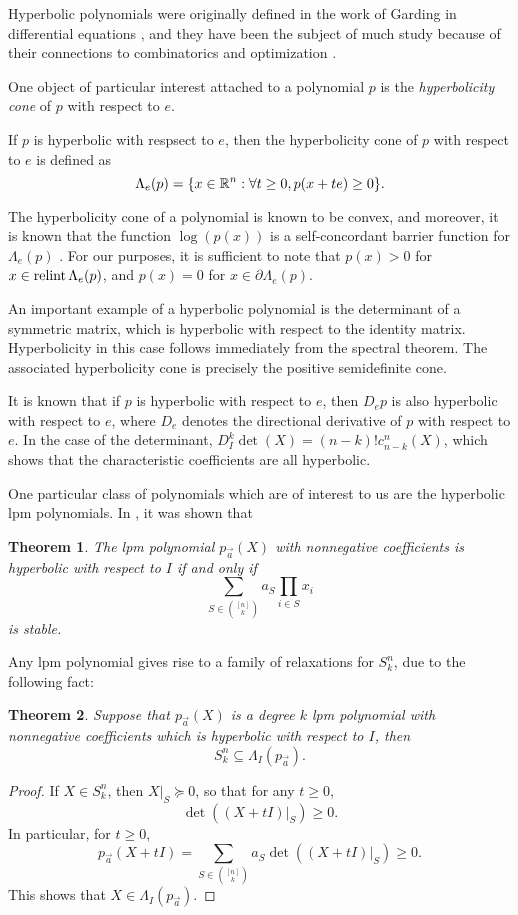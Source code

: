 \documentclass{amsart}
\newtheorem{theorem}{Theorem}[section]
\theoremstyle{definition}
\numberwithin{equation}{section}
\begin{document}
Hyperbolic polynomials were originally defined in the work of Garding in differential equations \cite{gaarding1951linear}, and they have been the subject of much study because of their connections to combinatorics and optimization \cite{wagner2011multivariate}.

One object of particular interest attached to a polynomial $p$ is the \emph{hyperbolicity cone} of $p$ with respect to $e$.

If $p$ is hyperbolic with respsect to $e$, then the hyperbolicity cone of $p$ with respect to $e$ is defined as
\[
    \Lambda_e(p) = \{x \in \mathbb{R}^n : \forall t \ge 0, p(x+te) \ge 0\}.
\]

The hyperbolicity cone of a polynomial is known to be convex, and moreover, it is known that the function $\log(p(x))$ is a self-concordant barrier function for $\Lambda_e(p)$ \cite{guler1997hyperbolic}. 
For our purposes, it is sufficient to note that $p(x) > 0$ for $x \in \operatorname*{relint}\Lambda_e(p)$, and $p(x) = 0$ for $x \in \partial \Lambda_e(p)$.

An important example of a hyperbolic polynomial is the determinant of a symmetric matrix, which is hyperbolic with respect to the identity matrix. Hyperbolicity in this case follows immediately from the spectral theorem. The associated hyperbolicity cone is precisely the positive semidefinite cone.

It is known that if $p$ is hyperbolic with respect to $e$, then $D_ep$ is also hyperbolic with respect to $e$, where $D_e$ denotes the directional derivative of $p$ with respect to $e$.
In the case of the determinant, $D_I^k\det(X) = (n-k)!c_{n-k}^n(X)$, which shows that the characteristic coefficients are all hyperbolic.

One particular class of polynomials which are of interest to us are the hyperbolic lpm polynomials.
In \cite{blekherman2021lin}, it was shown that 
\begin{theorem}
    The lpm polynomial $p_{\vec{a}}(X)$ with nonnegative coefficients is hyperbolic with respect to $I$ if and only if 
    \[
        \sum_{S \in \binom{[n]}{k}} a_S\prod_{i\in S}x_i
    \]
    is stable.
\end{theorem}

Any lpm polynomial gives rise to a family of relaxations for $S^n_k$, due to the following fact:
\begin{theorem}
    Suppose that $p_{\vec{a}}(X)$ is a degree $k$ lpm polynomial with nonnegative coefficients which is hyperbolic with respect to $I$, then 
    \[
        S^n_k \subseteq \Lambda_{I}(p_{\vec{a}}).
    \]
\end{theorem}
\begin{proof}
    If $X \in S^n_k$, then $X|_S \succeq 0$, so that for any $t \ge 0$,
    \[
        \det((X+tI)|_S) \ge 0.
    \]
    In particular, for $t \ge 0$,
    \[
        p_{\vec{a}}(X+tI) = \sum_{S \in \binom{[n]}{k}} a_S\det((X+tI)|_S) \ge 0.
    \]
    This shows that $X \in \Lambda_I(p_{\vec{a}})$.
\end{proof}
\end{document}
